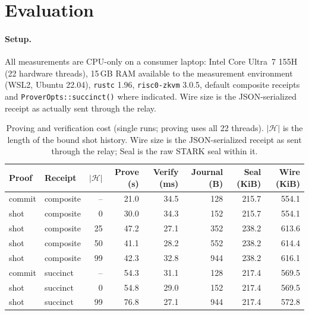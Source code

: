 \documentclass[11pt,a4paper]{article}
\newcommand{\code}[1]{\texttt{\small #1}}
\begin{document}
\section{Evaluation}
\label{sec:eval}

\paragraph{Setup.} All measurements are CPU-only on a consumer laptop:
Intel Core Ultra~7 155H (22 hardware threads), 15\,GB RAM available to the
measurement environment (WSL2, Ubuntu 22.04), \code{rustc} 1.96,
\code{risc0-zkvm} 3.0.5, default composite receipts and
\code{ProverOpts::succinct()} where indicated. Wire size is the
JSON-serialized receipt as actually sent through the relay.

\begin{table}[h]
\centering
\small
\begin{tabular}{@{}llrrrrrr@{}}
\toprule
\textbf{Proof} & \textbf{Receipt} & \textbf{$|\mathcal{H}|$} &
\textbf{Prove (s)} & \textbf{Verify (ms)} & \textbf{Journal (B)} &
\textbf{Seal (KiB)} & \textbf{Wire (KiB)} \\
\midrule
commit & composite & --  & 21.0 & 34.5 & 128 & 215.7 & 554.1 \\
shot   & composite & 0   & 30.0 & 34.3 & 152 & 215.7 & 554.1 \\
shot   & composite & 25  & 47.2 & 27.1 & 352 & 238.2 & 613.6 \\
shot   & composite & 50  & 41.1 & 28.2 & 552 & 238.2 & 614.4 \\
shot   & composite & 99  & 42.3 & 32.8 & 944 & 238.2 & 616.1 \\
commit & succinct  & --  & 54.3 & 31.1 & 128 & 217.4 & 569.5 \\
shot   & succinct  & 0   & 54.8 & 29.0 & 152 & 217.4 & 569.5 \\
shot   & succinct  & 99  & 76.8 & 27.1 & 944 & 217.4 & 572.8 \\
\bottomrule
\end{tabular}
\caption{Proving and verification cost (single runs; proving uses all 22
threads). $|\mathcal{H}|$ is the length of the bound shot history. Wire size
is the JSON-serialized receipt as sent through the relay; Seal is the raw
STARK seal within it.}
\label{tab:bench}
\end{table}
\end{document}
